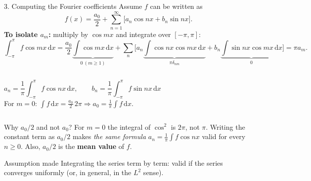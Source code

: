 \documentclass[aspectratio=169,10pt]{beamer}
\newcommand{\dd}{\,\mathrm{d}}
\begin{document}
\begin{frame}{3. Computing the Fourier coefficients}
  \footnotesize
  Assume $f$ can be written as
  \[
    f(x)=\frac{a_0}{2}+\sum_{n=1}^{\infty}\big[a_n\cos nx+b_n\sin nx\big].
  \]
  \textbf{To isolate $a_m$:} multiply by $\cos mx$ and integrate over $[-\pi,\pi]$:
  \[
    \int_{-\pi}^{\pi}\! f\cos mx\dd x=\frac{a_0}{2}\underbrace{\int\cos mx\dd x}_{0\ (m\ge1)}
    +\sum_n\Big[a_n\underbrace{\int\cos nx\cos mx\dd x}_{\pi\delta_{nm}}+b_n\underbrace{\int\sin nx\cos mx\dd x}_{0}\Big]=\pi a_m .
  \]
  \begin{columns}[T]
    \[
      \boxed{a_n=\frac1\pi\!\int_{-\pi}^{\pi}\! f\cos nx\dd x,\qquad
      b_n=\frac1\pi\!\int_{-\pi}^{\pi}\! f\sin nx\dd x}
    \]
    For $m=0$: $\int f\dd x=\tfrac{a_0}{2}\,2\pi\Rightarrow a_0=\tfrac1\pi\!\int f\dd x$.
  \end{columns}
  \begin{keybox}{Why $a_0/2$ and not $a_0$?}
    For $m=0$ the integral of $\cos^2$ is $2\pi$, not $\pi$. Writing the constant term as $a_0/2$ makes \emph{the same formula} $a_n=\frac1\pi\int f\cos nx$ valid for every $n\ge0$. Also, $a_0/2$ is the \textbf{mean value} of $f$.
  \end{keybox}
  \begin{warnbox}{Assumption made}
    Integrating the series term by term: valid if the series converges uniformly (or, in general, in the $L^2$ sense).
  \end{warnbox}
\end{frame}
\end{document}
